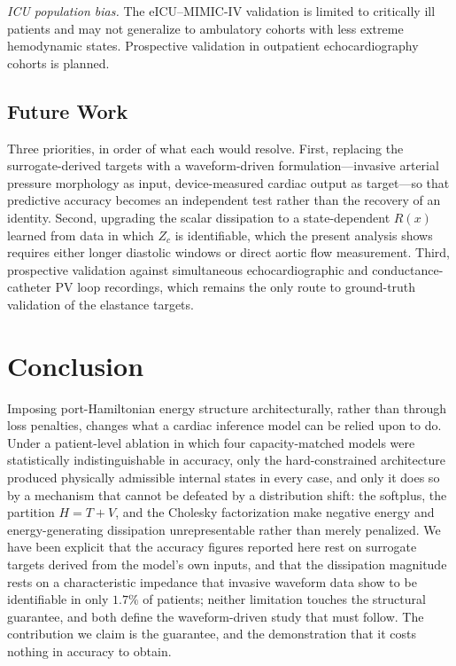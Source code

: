 \documentclass[journal]{IEEEtran}
\begin{document}
\emph{ICU population bias.} The eICU--MIMIC-IV validation is limited to critically ill patients and may not generalize to ambulatory cohorts with less extreme hemodynamic states. Prospective validation in outpatient echocardiography cohorts is planned.

\subsection{Future Work}
Three priorities, in order of what each would resolve. First, replacing the surrogate-derived targets with a waveform-driven formulation---invasive arterial pressure morphology as input, device-measured cardiac output as target---so that predictive accuracy becomes an independent test rather than the recovery of an identity. Second, upgrading the scalar dissipation to a state-dependent $R(x)$ learned from data in which $Z_c$ is identifiable, which the present analysis shows requires either longer diastolic windows or direct aortic flow measurement. Third, prospective validation against simultaneous echocardiographic and conductance-catheter PV loop recordings, which remains the only route to ground-truth validation of the elastance targets.

\section{Conclusion}\label{sec:conclusion}
Imposing port-Hamiltonian energy structure architecturally, rather than through loss penalties, changes what a cardiac inference model can be relied upon to do. Under a patient-level ablation in which four capacity-matched models were statistically indistinguishable in accuracy, only the hard-constrained architecture produced physically admissible internal states in every case, and only it does so by a mechanism that cannot be defeated by a distribution shift: the softplus, the partition $H=T+V$, and the Cholesky factorization make negative energy and energy-generating dissipation unrepresentable rather than merely penalized. We have been explicit that the accuracy figures reported here rest on surrogate targets derived from the model's own inputs, and that the dissipation magnitude rests on a characteristic impedance that invasive waveform data show to be identifiable in only $1.7\%$ of patients; neither limitation touches the structural guarantee, and both define the waveform-driven study that must follow. The contribution we claim is the guarantee, and the demonstration that it costs nothing in accuracy to obtain.
\end{document}
